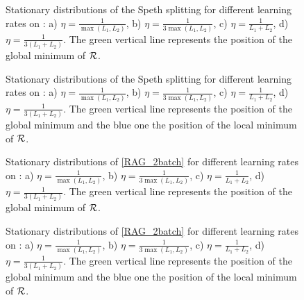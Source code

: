 \documentclass[article,authoryear,jmlmc]{beg_32}             %
\begin{document}
\begin{figure}[h!]
	\centering
	\scalebox{0.60}{}
	\caption{Stationary distributions of the Speth splitting for different learning rates on \exOne: a) $\eta=\frac{1}{\max(L_1,L_2)}$, b) $\eta=\frac{1}{3\max(L_1,L_2)}$, c) $\eta=\frac{1}{L_1+L_2}$, d) $\eta=\frac{1}{3(L_1+L_2)}$. The green vertical line represents the position of the global minimum of $\mathcal{R}$.}
	\label{speth_ex1}
\end{figure}

\begin{figure}[h!]
	\centering
	\scalebox{0.60}{}
	\caption{Stationary distributions of the Speth splitting for different learning rates on \exTwo: a) $\eta=\frac{1}{\max(L_1,L_2)}$, b) $\eta=\frac{1}{3\max(L_1,L_2)}$, c) $\eta=\frac{1}{L_1+L_2}$, d) $\eta=\frac{1}{3(L_1+L_2)}$. The green vertical line represents the position of the global minimum and the blue one the position of the local minimum of $\mathcal{R}$.}
	\label{speth_ex2}
\end{figure}

\begin{figure}[h!]
	\centering
	\scalebox{0.60}{}
	\caption{Stationary distributions of \eqref{RAG_2batch} for different learning rates on \exOne: a) $\eta=\frac{1}{\max(L_1,L_2)}$, b) $\eta=\frac{1}{3\max(L_1,L_2)}$, c) $\eta=\frac{1}{L_1+L_2}$, d) $\eta=\frac{1}{3(L_1+L_2)}$. The green vertical line represents the position of the global minimum of $\mathcal{R}$.}
	\label{IAG_ex1}
\end{figure}

\begin{figure}[h!]
	\centering
	\scalebox{0.60}{}
	\caption{Stationary distributions of \eqref{RAG_2batch} for different learning rates on \exTwo: a) $\eta=\frac{1}{\max(L_1,L_2)}$, b) $\eta=\frac{1}{3\max(L_1,L_2)}$, c) $\eta=\frac{1}{L_1+L_2}$, d) $\eta=\frac{1}{3(L_1+L_2)}$. The green vertical line represents the position of the global minimum and the blue one the position of the local minimum of $\mathcal{R}$.}
	\label{IAG_ex2}
\end{figure}
\clearpage
\end{document}
